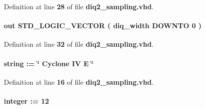Definition at line {\bf 28} of file {\bf diq2\+\_\+sampling.\+vhd}.

\paragraph[{data\+\_\+out\+\_\+l}]{ {\bfseries \textcolor{keywordflow}{out}\textcolor{vhdlchar}{ }} {\bfseries \textcolor{comment}{S\+T\+D\+\_\+\+L\+O\+G\+I\+C\+\_\+\+V\+E\+C\+T\+OR}\textcolor{vhdlchar}{ }\textcolor{vhdlchar}{(}\textcolor{vhdlchar}{ }\textcolor{vhdlchar}{ }\textcolor{vhdlchar}{ }\textcolor{vhdlchar}{ }{\bfseries {\bf diq\+\_\+width}} \textcolor{vhdlchar}{ }\textcolor{keywordflow}{D\+O\+W\+N\+TO}\textcolor{vhdlchar}{ }\textcolor{vhdlchar}{ } \textcolor{vhdldigit}{0} \textcolor{vhdlchar}{ }\textcolor{vhdlchar}{)}\textcolor{vhdlchar}{ }} \hspace{0.3cm}{\ttfamily [Port]}}\label{classdiq2__sampling_a7ea176563683dc76b4d22352e7844d89}


Definition at line {\bf 32} of file {\bf diq2\+\_\+sampling.\+vhd}.

\paragraph[{dev\+\_\+family}]{ {\bfseries \textcolor{vhdlchar}{ }} {\bfseries \textcolor{comment}{string}\textcolor{vhdlchar}{ }\textcolor{vhdlchar}{ }\textcolor{vhdlchar}{\+:}\textcolor{vhdlchar}{=}\textcolor{vhdlchar}{ }\textcolor{vhdlchar}{ }\textcolor{vhdlchar}{ }\textcolor{vhdlchar}{ }\textcolor{keyword}{\char`\"{} Cyclone I\+V E \char`\"{}}\textcolor{vhdlchar}{ }} \hspace{0.3cm}{\ttfamily [Generic]}}\label{classdiq2__sampling_a1314572919959082d23e5f98e64a0ce2}


Definition at line {\bf 16} of file {\bf diq2\+\_\+sampling.\+vhd}.

\paragraph[{diq\+\_\+width}]{ {\bfseries \textcolor{vhdlchar}{ }} {\bfseries \textcolor{comment}{integer}\textcolor{vhdlchar}{ }\textcolor{vhdlchar}{ }\textcolor{vhdlchar}{\+:}\textcolor{vhdlchar}{=}\textcolor{vhdlchar}{ }\textcolor{vhdlchar}{ } \textcolor{vhdldigit}{12} \textcolor{vhdlchar}{ }} \hspace{0.3cm}{\ttfamily [Generic]}}\label{classdiq2__sampling_a72012255b2336a3619392835aa664f99}


